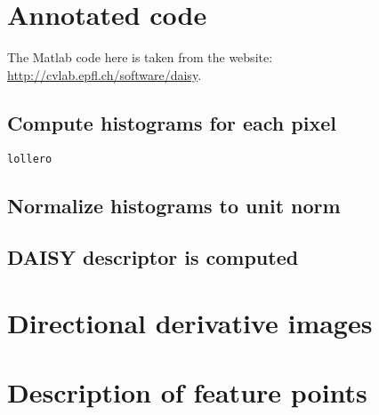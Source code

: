 
\section{Annotated code}

The Matlab code here is taken from the website: \url{http://cvlab.epfl.ch/software/daisy}.

\subsection{Compute histograms for each pixel}

\begin{lstlisting}
lollero
\end{lstlisting}

\subsection{Normalize histograms to unit norm}

\subsection{DAISY descriptor is computed}

\section{Directional derivative images}

\section{Description of feature points}
